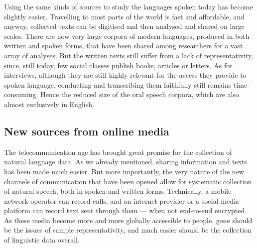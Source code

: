 \documentclass[../thesis.tex]{subfiles}
\begin{document}
Using the same kinds of sources to study the languages spoken today has become slightly
easier. Travelling to most parts of the world is fast and affordable, and anyway,
collected texts can be digitised and then analysed and shared on large scales. There are
now very large corpora of modern languages, produced in both written
\cite{GrieveCorpusbasedRegional2009,GrieveRegionalVariation2016,BiberCorpusBasedInvestigations1996,McEnerySwearingModern2004}
and spoken
\cite{McEnerySwearingModern2004,SchweinbergerSwearingIrish2018,StenstromTrendsTeenage2002,LabovSocialStratification1966}
forms, that have been shared among researchers for a vast array of analyses. But the
written texts still suffer from a lack of representativity, since, still today, few
social classes publish books, articles or letters. As for interviews, although they are
still highly relevant for the access they provide to spoken language, conducting and
transcribing them faithfully still remains time-consuming. Hence the reduced size of the
oral speech corpora, which are also almost exclusively in English.


\subsection{New sources from online media}
The telecommunication age has brought great promise for the collection of natural
language data. As we already mentioned, sharing information and texts has been made much
easier. But more importantly, the very nature of the new channels of
communication that have been opened allow for systematic collection of natural speech,
both in spoken and written forms. Technically, a mobile network operator can record
calls, and an internet provider or a social media platform can record text sent through them
--- when not end-to-end encrypted. As these media become more and more globally
accessible to people, gone should be the issues of sample representativity, and much
easier should be the collection of linguistic data overall.
\end{document}

